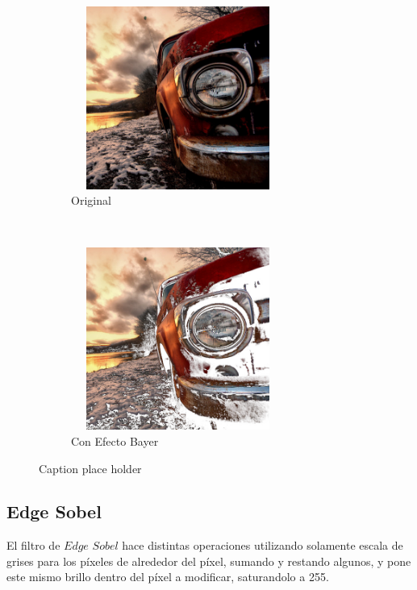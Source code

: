\begin{figure}[H]
    \centering
    \begin{subfigure}[H]{0.5\textwidth}
        \centering
        \includegraphics[width=7cm, height=6cm]{images/car.png}
        \caption{Original}
    \end{subfigure}%
    ~ 
    \begin{subfigure}[H]{0.5\textwidth}
        \centering
        \includegraphics[width=7cm, height=6cm]{images/img_cambiaColor.png}
        \caption{Con Efecto Bayer}
    \end{subfigure}
    \caption{Caption place holder}
\end{figure} 


\subsection{Edge Sobel}

El filtro de $Edge$ $Sobel$ hace distintas operaciones utilizando solamente escala de grises para los píxeles de alrededor del píxel, sumando y restando algunos, y pone este mismo brillo dentro del píxel a modificar, saturandolo a 255. 

